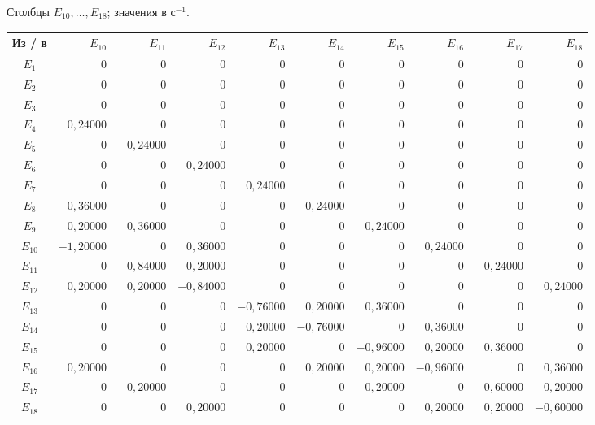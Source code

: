 \documentclass[12pt,a4paper]{article}
\begin{document}
\noindent Столбцы $E_{10},\ldots,E_{18}$; значения в $\text{с}^{-1}$.
\begin{center}\scriptsize\setlength{\tabcolsep}{2.6pt}\renewcommand{\arraystretch}{1.18}
\begin{tabular}{|c|r|r|r|r|r|r|r|r|r|}\hline
Из / в&$E_{10}$&$E_{11}$&$E_{12}$&$E_{13}$&$E_{14}$&$E_{15}$&$E_{16}$&$E_{17}$&$E_{18}$\\\hline
$E_{1}$&$0$&$0$&$0$&$0$&$0$&$0$&$0$&$0$&$0$\\\hline
$E_{2}$&$0$&$0$&$0$&$0$&$0$&$0$&$0$&$0$&$0$\\\hline
$E_{3}$&$0$&$0$&$0$&$0$&$0$&$0$&$0$&$0$&$0$\\\hline
$E_{4}$&$0{,}24000$&$0$&$0$&$0$&$0$&$0$&$0$&$0$&$0$\\\hline
$E_{5}$&$0$&$0{,}24000$&$0$&$0$&$0$&$0$&$0$&$0$&$0$\\\hline
$E_{6}$&$0$&$0$&$0{,}24000$&$0$&$0$&$0$&$0$&$0$&$0$\\\hline
$E_{7}$&$0$&$0$&$0$&$0{,}24000$&$0$&$0$&$0$&$0$&$0$\\\hline
$E_{8}$&$0{,}36000$&$0$&$0$&$0$&$0{,}24000$&$0$&$0$&$0$&$0$\\\hline
$E_{9}$&$0{,}20000$&$0{,}36000$&$0$&$0$&$0$&$0{,}24000$&$0$&$0$&$0$\\\hline
$E_{10}$&$-1{,}20000$&$0$&$0{,}36000$&$0$&$0$&$0$&$0{,}24000$&$0$&$0$\\\hline
$E_{11}$&$0$&$-0{,}84000$&$0{,}20000$&$0$&$0$&$0$&$0$&$0{,}24000$&$0$\\\hline
$E_{12}$&$0{,}20000$&$0{,}20000$&$-0{,}84000$&$0$&$0$&$0$&$0$&$0$&$0{,}24000$\\\hline
$E_{13}$&$0$&$0$&$0$&$-0{,}76000$&$0{,}20000$&$0{,}36000$&$0$&$0$&$0$\\\hline
$E_{14}$&$0$&$0$&$0$&$0{,}20000$&$-0{,}76000$&$0$&$0{,}36000$&$0$&$0$\\\hline
$E_{15}$&$0$&$0$&$0$&$0{,}20000$&$0$&$-0{,}96000$&$0{,}20000$&$0{,}36000$&$0$\\\hline
$E_{16}$&$0{,}20000$&$0$&$0$&$0$&$0{,}20000$&$0{,}20000$&$-0{,}96000$&$0$&$0{,}36000$\\\hline
$E_{17}$&$0$&$0{,}20000$&$0$&$0$&$0$&$0{,}20000$&$0$&$-0{,}60000$&$0{,}20000$\\\hline
$E_{18}$&$0$&$0$&$0{,}20000$&$0$&$0$&$0$&$0{,}20000$&$0{,}20000$&$-0{,}60000$\\\hline
\end{tabular}\end{center}
\newpage
\end{document}
